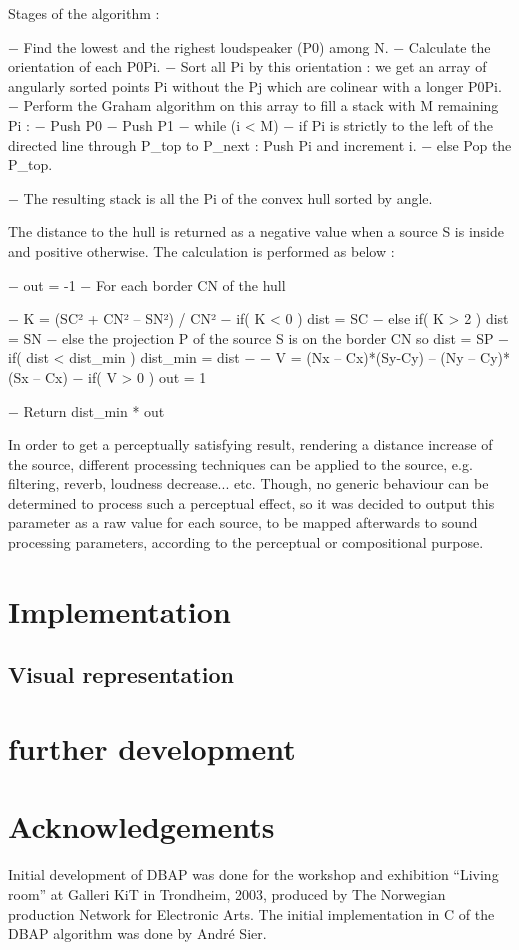 \documentclass[twoside,10pt]{article}
\begin{document}

	Stages of the algorithm :

−	Find the lowest and the righest loudspeaker (P0) among N.
−	Calculate the orientation of each P0Pi.
−	Sort all Pi by this orientation : we get an array of angularly sorted points Pi without the Pj which are colinear with a longer P0Pi.
−	Perform the Graham algorithm on this array to fill a stack with M remaining Pi :
−	Push P0
−	Push P1
−	while (i < M)
−	if Pi is strictly to the left of the directed line through P_top to P_next : Push Pi and increment i.
−	else Pop the P_top.

−	The resulting stack is all the Pi of the convex hull sorted by angle.

The distance to the hull is returned as a negative value when a source S is inside and positive otherwise. The calculation is performed as below :

−	out = -1
−	For each border CN of the hull

−	K = (SC² + CN² – SN²) / CN²
−	if( K < 0 ) dist = SC
−	else if( K > 2 ) dist = SN
−	else the projection P of the source S is on the border CN so dist = SP
−	if( dist < dist_min ) dist_min = dist
−	
−	V =  (Nx – Cx)*(Sy-Cy) – (Ny – Cy)*(Sx – Cx)
−	if( V > 0 ) out = 1

−	Return dist_min * out

In order to get a perceptually satisfying result, rendering a distance increase of the source, different processing techniques can be applied to the source, e.g. filtering, reverb, loudness decrease... etc. Though, no generic behaviour can be determined to process such a perceptual effect, so it was decided to output this parameter as a raw value for each source, to be mapped afterwards to sound processing parameters, according to the perceptual or compositional purpose. 


\section{Implementation}

\subsection{Visual representation}






\section{further development}


\section{Acknowledgements}

Initial development of DBAP was done for the workshop and exhibition ``Living room'' at Galleri KiT in Trondheim, 2003, produced by The Norwegian production Network for Electronic Arts. The initial implementation in C of the DBAP algorithm was done by André Sier. 




\end{document}
